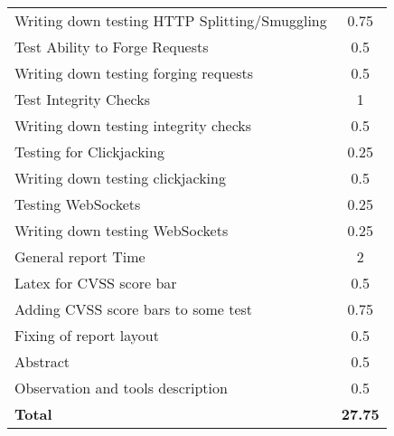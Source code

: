 \begin{table}[H]
\begin{tabular*}{\textwidth}{@{\extracolsep{\fill}} l c@{\extracolsep{0pt}} }
	Writing down testing HTTP Splitting/Smuggling & 0.75 \\
	Test Ability to Forge Requests				& 0.5 \\
	Writing down testing forging requests 		& 0.5 \\
	Test Integrity Checks						& 1 \\
	Writing down testing integrity checks 		& 0.5 \\
	Testing for Clickjacking					& 0.25 \\
	Writing down testing clickjacking 			& 0.5 \\
	Testing WebSockets							& 0.25 \\
	Writing down testing WebSockets 			& 0.25 \\
	General report Time							& 2 \\
	Latex for CVSS score bar					& 0.5 \\
	Adding CVSS score bars to some test 		& 0.75 \\
	Fixing of report layout						& 0.5 \\
	Abstract									& 0.5 \\
	Observation and tools description			& 0.5 \\
\hline\hline
\textbf{Total}									& \textbf{27.75}
\end{tabular*}
\end{table}
\clearpage

